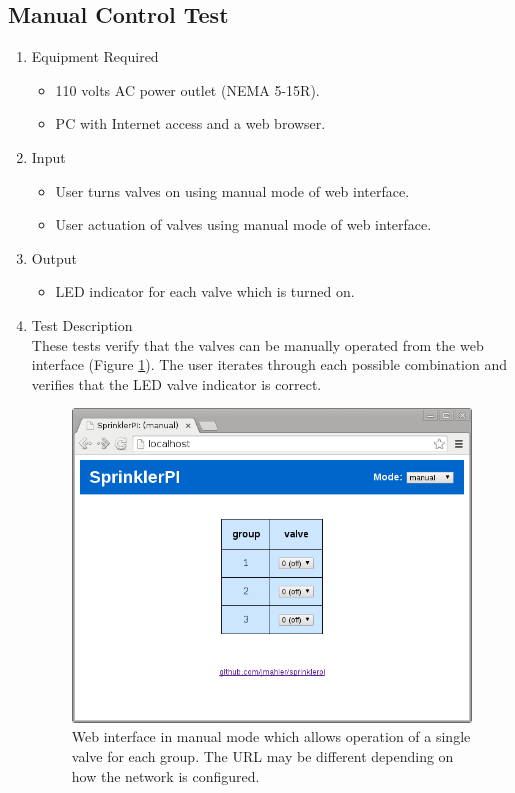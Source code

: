 \documentclass{article}
\begin{document}
\clearpage
\subsection{Manual Control Test}
\label{sec:manual-control-test}

\begin{enumerate}
\item Equipment Required
	\begin{itemize}
	\item 110 volts AC power outlet (NEMA 5-15R).
	\item PC with Internet access and a web browser.
	\end{itemize}
\item Input
	\begin{itemize}
	\item User turns valves on using manual mode of web interface.
	\item User actuation of valves using manual mode of web interface.
	\end{itemize}
\item Output
	\begin{itemize}
	\item LED indicator for each valve which is turned on.
	\end{itemize}
\item Test Description \\

These tests verify that the valves can be manually operated from
the web interface (Figure \ref{fig:www-manual_mode}).
The user iterates through each possible combination and verifies
that the LED valve indicator is correct.

\begin{figure}[hbp!]
\begin{center}
\includegraphics[scale=0.5]{img/www-manual_mode}
\end{center}
\caption{Web interface in manual mode which allows operation of
a single valve for each group.
The URL may be different depending on how the network is configured.}
\label{fig:www-manual_mode}
\end{figure}


\end{enumerate}
\end{document}
